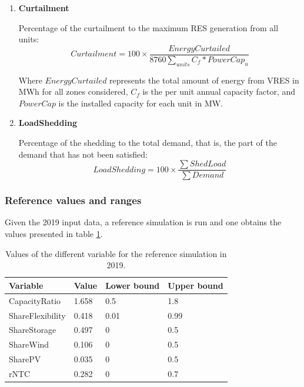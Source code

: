 \begin{enumerate}
    \item \textbf{Curtailment}

    Percentage of the curtailment to the maximum RES generation from all units:
    \begin{equation}
        Curtailment = 100\times \frac{EnergyCurtailed}{8760\sum_{units} C_f * PowerCap_u}
    \end{equation}

    Where $EnergyCurtailed$ represents the total amount of energy from VRES in MWh for all zones considered, $C_f$ is the per unit annual capacity factor, and $PowerCap$ is the installed capacity for each unit in MW.

    \item \textbf{LoadShedding}

    Percentage of the shedding to the total demand, that is, the part of the demand that has not been satisfied:
    \begin{equation}
        LoadShedding = 100\times \frac{\sum ShedLoad}{\sum Demand}
    \end{equation}
\end{enumerate}


\subsubsection{Reference values and ranges}

Given the 2019 input data, a reference simulation is run and one obtains the values presented in table \ref{table:reference-values}.

\begin{table}[h]
    \centering
    \begin{tabular}{|l l l l|}
        \hline
        Variable         & Value  & Lower bound & Upper bound \\ \hline
        CapacityRatio    & 1.658  & 0.5         & 1.8         \\
        ShareFlexibility & 0.418  & 0.01        & 0.99        \\
        ShareStorage     & 0.497  & 0           & 0.5         \\
        ShareWind        & 0.106  & 0           & 0.5         \\
        SharePV          & 0.035  & 0           & 0.5         \\
        rNTC             & 0.282  & 0           & 0.7         \\ \hline
    \end{tabular}
    \caption{Values of the different variable for the reference simulation in 2019.}
    \label{table:reference-values}
\end{table}

